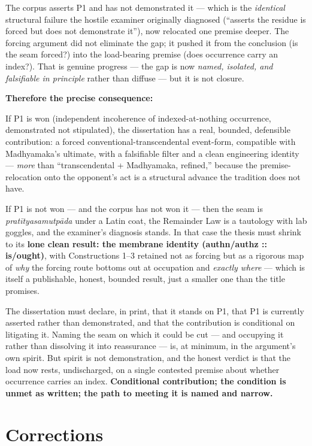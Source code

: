 \documentclass[11pt]{article}
\begin{document}
The corpus asserts P1 and has not demonstrated it — which is the \emph{identical} structural failure the hostile examiner originally diagnosed (``asserts the residue is forced but does not demonstrate it''), now relocated one premise deeper. The forcing argument did not eliminate the gap; it pushed it from the conclusion (is the seam forced?) into the load-bearing premise (does occurrence carry an index?). That is genuine progress — the gap is now \emph{named, isolated, and falsifiable in principle} rather than diffuse — but it is not closure.

\textbf{Therefore the precise consequence:}

If P1 is won (independent incoherence of indexed-at-nothing occurrence, demonstrated not stipulated), the dissertation has a real, bounded, defensible contribution: a forced conventional-transcendental event-form, compatible with Madhyamaka's ultimate, with a falsifiable filter and a clean engineering identity — \emph{more} than ``transcendental + Madhyamaka, refined,'' because the premise-relocation onto the opponent's act is a structural advance the tradition does not have.

If P1 is not won — and the corpus has not won it — then the seam is \emph{pratītyasamutpāda} under a Latin coat, the Remainder Law is a tautology with lab goggles, and the examiner's diagnosis stands. In that case the thesis must shrink to its \textbf{lone clean result: the membrane identity (authn/\allowbreak{}authz :: is/\allowbreak{}ought)}, with Constructions 1–3 retained not as forcing but as a rigorous map of \emph{why} the forcing route bottoms out at occupation and \emph{exactly where} — which is itself a publishable, honest, bounded result, just a smaller one than the title promises.

The dissertation must declare, in print, that it stands on P1, that P1 is currently asserted rather than demonstrated, and that the contribution is conditional on litigating it. Naming the seam on which it could be cut — and occupying it rather than dissolving it into reassurance — is, at minimum, in the argument's own spirit. But spirit is not demonstration, and the honest verdict is that the load now rests, undischarged, on a single contested premise about whether occurrence carries an index. \textbf{Conditional contribution; the condition is unmet as written; the path to meeting it is named and narrow.}

\section*{Corrections}\label{corrections}
\end{document}

